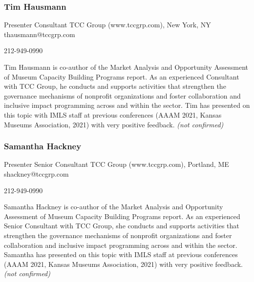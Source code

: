 \documentclass{report}
\begin{document}
              

              
                \subsubsection*{ Tim  Hausmann }
                Presenter\newline
                Consultant\newline
                TCC Group (www.tccgrp.com), New York, NY
                \newline
                thausmann@tccgrp.com\newline
                
                212-949-0990\newline

                Tim Hausmann is co-author of the Market Analysis and Opportunity Assessment of Museum Capacity Building Programs report. As an experienced Consultant with TCC Group, he conducts and supports activities that strengthen the governance mechanisms of nonprofit organizations and foster collaboration and inclusive impact programming across and within the sector. Tim has presented on this topic with IMLS staff at previous conferences (AAAM 2021, Kansas Museums Association, 2021) with very positive feedback.
                \emph{ (not confirmed) }
              

              
                \subsubsection*{ Samantha Hackney }
                Presenter\newline
                Senior Consultant\newline
                TCC Group (www.tccgrp.com), Portland, ME
                \newline
                shackney@tccgrp.com\newline
                
                212-949-0990\newline

                Samantha Hackney is co-author of the Market Analysis and Opportunity Assessment of Museum Capacity Building Programs report. As an experienced Senior Consultant with TCC Group, she conducts and supports activities that strengthen the governance mechanisms of nonprofit organizations and foster collaboration and inclusive impact programming across and within the sector. Samantha has presented on this topic with IMLS staff at previous conferences (AAAM 2021, Kansas Museums Association, 2021) with very positive feedback.
                \emph{ (not confirmed) }
              
\end{document}
